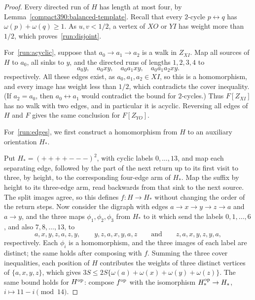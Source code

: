 \begin{proof}
Every directed run of $H$ has length at most four, by Lemma~\ref{compact390:balanced-template}. Recall that every $2$-cycle $p\leftrightarrow q$ has
$\omega(p)+\omega(q)\ge1$. As $u,v<1/2$, a vertex of $XO$ or $YI$ has weight more than $1/2$, which proves~\ref{run:disjoint}.

For~\ref{run:acyclic}, suppose that $a_0\to a_1\to a_2$ is a walk in $Z_{XI}$. Map all sources of $H$ to $a_0$,
all sinks to $y$, and the directed runs of lengths $1,2,3,4$ to
\[
 a_0y,\quad a_0xy,\quad a_0a_1xy,\quad a_0a_1a_2xy.
\]
respectively. All these edges exist, as $a_0,a_1,a_2\in XI$, so this is a homomorphism, and every image has weight
less than $1/2$, which contradicts the cover inequality. (If $a_2=a_0$, then $a_0\leftrightarrow a_1$ would contradict the bound for $2$-cycles.) Thus $F[Z_{XI}]$ has no walk with two edges, and in particular it is acyclic. Reversing all edges of $H$ and $F$ gives the same conclusion for $F[Z_{YO}]$.

For~\ref{run:edges}, we first construct a homomorphism from $H$ to an auxiliary orientation $H_*$.

Put $H_*=(++++---)^2$, with cyclic labels $0,\ldots,13$, and
map each separating edge, followed by the part of the next return up to its first visit
to three, by height, to the corresponding four-edge arm of $H_*$.
Map the suffix by height to its three-edge arm, read backwards
from that sink to the next source. The split images agree, so this defines $f:H\to H_*$ without
changing the order of the return steps.
Now consider the digraph with edges $a\to x\to y\to z\to a$ and $a\to y$, and the three maps $\phi_1,\phi_2,\phi_3$ from $H_*$ to it which send the labels $0,1,\ldots,6$, and also $7,8,\ldots,13$, to
\[
 a,x,y,z,a,z,y,\qquad y,z,a,x,y,a,z\qquad\text{and}\qquad z,a,x,y,z,y,a,
\]
respectively. Each $\phi_i$ is a homomorphism, and the three images of each
label are distinct; the same holds after composing with $f$.
Summing the three cover inequalities, each position of $H$ contributes the weights of three distinct vertices of $\{a,x,y,z\}$, which gives $3S\le2S\{\omega(a)+\omega(x)+\omega(y)+\omega(z)\}$. The same bound holds for $H^{\rm op}$: compose $f^{\rm op}$ with
the isomorphism $H_*^{\rm op}\to H_*$, $i\mapsto11-i\pmod{14}$.


\end{proof}
